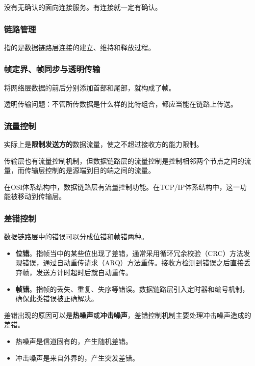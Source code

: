 \documentclass[12pt, a4paper, oneside]{ctexart}
\begin{document}
没有无确认的面向连接服务。有连接就一定有确认。

\subsubsection{链路管理}

指的是数据链路层连接的建立、维持和释放过程。

\subsubsection{帧定界、帧同步与透明传输}

将网络层数据的前后分别添加首部和尾部，就构成了帧。

透明传输问题：不管所传数据是什么样的比特组合，都应当能在链路上传送。

\subsubsection{流量控制}

实际上是\textbf{限制发送方的}数据流量，使之不超过接收方的能力限制。

传输层也有流量控制机制，但数据链路层的流量控制是控制相邻两个节点之间的流量，而传输层控制的是源端到目的端之间的流量。

在OSI体系结构中，数据链路层有流量控制功能。在TCP/IP体系结构中，这一功能被移动到传输层。

\subsubsection{差错控制}

数据链路层中的错误可以分成位错和帧错两种。
\begin{itemize}
    \item {\bf 位错}。指帧当中的某些位出现了差错，通常采用循环冗余校验（CRC）方法发现错误，通过自动重传请求（ARQ）方法重传。接收方检测到错误之后直接丢弃帧，发送方计时超时后就自动重传。
    \item {\bf 帧错}。指帧的丢失、重复、失序等错误。数据链路层引入定时器和编号机制，确保此类错误被正确解决。
\end{itemize}

差错出现的原因可以是\textbf{热噪声}或\textbf{冲击噪声}，差错控制机制主要处理冲击噪声造成的差错。
\begin{itemize}
    \item 热噪声是信道固有的，产生随机差错。
    \item 冲击噪声是来自外界的，产生突发差错。
\end{itemize}
\end{document}
